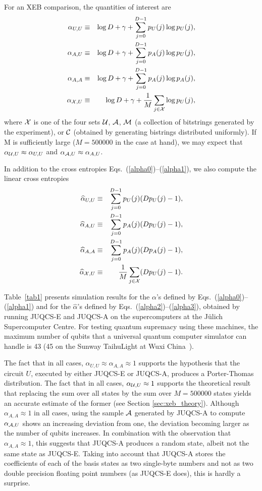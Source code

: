 For an XEB comparison, the quantities of interest are
\begin{eqnarray}
\alpha_{U,U}&\equiv&\log D +\gamma + \sum_{j=0}^{D-1} p_U(j) \log p_U(j),
\label{alpha0}
\\
\alpha_{A,U}&\equiv&\log D +\gamma + \sum_{j=0}^{D-1} p_A(j) \log p_U(j),
\\
\alpha_{A,A}&\equiv&\log D +\gamma + \sum_{j=0}^{D-1} p_A(j) \log p_A(j),
\\
\alpha_{{\cal X},U}&\equiv&\log D +\gamma + \frac{1}{M}\sum_{j\in{\cal X}} \log p_U(j),
\label{alpha1}
\end{eqnarray}
where ${\cal X}$ is one of the four sets ${\cal U}$, ${\cal A}$,
${\cal M}$ (a collection of bitstrings generated by the experiment), or
${\cal C}$ (obtained by generating bistrings distributed uniformly).
If M is sufficiently large ($M=500000$ in the case at hand), we may expect that
$\alpha_{{\cal U},U}\approx \alpha_{U,U}$ and
$\alpha_{{\cal A},U}\approx \alpha_{A,U}$.

In addition to the cross entropies Eqs.~(\ref{alpha0})--(\ref{alpha1}), we also
compute the linear cross entropies
\begin{eqnarray}
\widehat\alpha_{U,U}&\equiv&\sum_{j=0}^{D-1} p_U(j) (D p_U(j) -1),
\label{alpha2}
\\
\widehat\alpha_{A,U}&\equiv& \sum_{j=0}^{D-1} p_A(j) (D p_U(j)-1),
\\
\widehat\alpha_{A,A}&\equiv&\sum_{j=0}^{D-1} p_A(j) (D p_A(j)-1),
\\
\widehat\alpha_{{\cal X},U}&\equiv& \frac{1}{M}\sum_{j\in{\cal X}} (D p_U(j)-1).
\label{alpha3}
\end{eqnarray}


Table~\ref{tab1} presents simulation results
for the $\alpha$'s defined by Eqs.~(\ref{alpha0})--(\ref{alpha1}) and
for the $\widehat\alpha$'s defined by Eqs.~(\ref{alpha2})--(\ref{alpha3}),
obtained by running JUQCS-E and JUQCS-A on the supercomputers at the J\"ulich Supercomputer Centre.
For testing quantum supremacy using these machines, the maximum number of qubits that a
universal quantum computer simulator can handle is 43 (45 on the Sunway TaihuLight at Wuxi China~\cite{RAED19a}).

The fact that in all cases, $\alpha_{U,U}\approx\alpha_{A,A}\approx 1$ supports
the hypothesis that the circuit $U$, executed by either JUQCS-E or JUQCS-A, produces a Porter-Thomas distribution.
The fact that in all cases, $\alpha_{{\cal U},U}\approx1$ supports the
theoretical result
that replacing the sum over all states by the sum over $M=500000$ states
yields an accurate estimate of the former (see Section \ref{sec:xeb_theory}).
Although $\alpha_{A,A}\approx 1$ in all cases, using the sample ${\cal A}$
generated by JUQCS-A to compute $\alpha_{{\cal A},U}$
shows an increasing deviation from one, the deviation becoming larger as the number of qubits increases.
In combination with the observation that $\alpha_{A,A}\approx 1$, this suggests that
JUQCS-A produces a random state, albeit not the same state as JUQCS-E.
Taking into account that JUQCS-A stores the coefficients of each of the basis states
as two single-byte numbers and not as two double precision floating point numbers (as JUQCS-E does), this is hardly a surprise.

